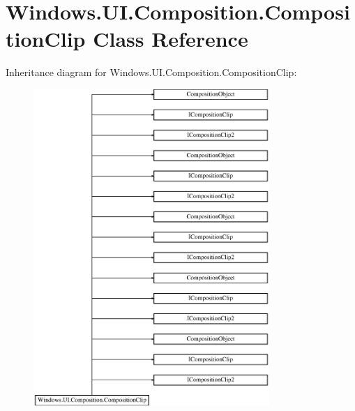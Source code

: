 \hypertarget{class_windows_1_1_u_i_1_1_composition_1_1_composition_clip}{}\section{Windows.\+U\+I.\+Composition.\+Composition\+Clip Class Reference}
\label{class_windows_1_1_u_i_1_1_composition_1_1_composition_clip}
Inheritance diagram for Windows.\+U\+I.\+Composition.\+Composition\+Clip\+:\begin{figure}[H]
\begin{center}
\leavevmode
\includegraphics[height=12.000000cm]{class_windows_1_1_u_i_1_1_composition_1_1_composition_clip}
\end{center}
\end{figure}
